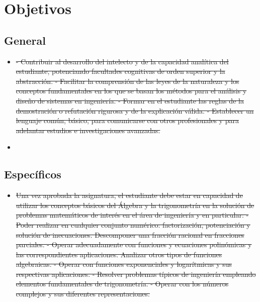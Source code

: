 \documentclass[11pt]{article}
\providecommand{\DIFaddtex}[1]{{\protect\color{blue}\uwave{#1}}} %
\providecommand{\DIFdeltex}[1]{{\protect\color{red}\sout{#1}}}                      %
\providecommand{\DIFaddbegin}{} %
\providecommand{\DIFaddend}{} %
\providecommand{\DIFdelbegin}{} %
\providecommand{\DIFdelend}{} %
\providecommand{\DIFadd}[1]{\texorpdfstring{\DIFaddtex{#1}}{#1}} %
\providecommand{\DIFdel}[1]{\texorpdfstring{\DIFdeltex{#1}}{}} %
\newcommand{\DIFscaledelfig}{0.5}
\newlength{\DIFdelgraphicswidth} %
\newlength{\DIFdelgraphicsheight} %
\newcommand{\DIFaddincludegraphics}[2][]{{\color{blue}\fbox{\DIFOincludegraphics[#1]{#2}}}} %
\newcommand{\DIFdelincludegraphics}[2][]{%
\sbox{\DIFdelgraphicsbox}{\DIFOincludegraphics[#1]{#2}}%
\settoboxwidth{\DIFdelgraphicswidth}{\DIFdelgraphicsbox} %
\settoboxtotalheight{\DIFdelgraphicsheight}{\DIFdelgraphicsbox} %
\scalebox{\DIFscaledelfig}{%
\parbox[b]{\DIFdelgraphicswidth}{\usebox{\DIFdelgraphicsbox}\\[-\baselineskip] \rule{\DIFdelgraphicswidth}{0em}}\llap{\resizebox{\DIFdelgraphicswidth}{\DIFdelgraphicsheight}{%
\setlength{\unitlength}{\DIFdelgraphicswidth}%
\begin{picture}(1,1)%
\thicklines\linethickness{2pt} %
{\color[rgb]{1,0,0}\put(0,0){\framebox(1,1){}}}%
{\color[rgb]{1,0,0}\put(0,0){\line( 1,1){1}}}%
{\color[rgb]{1,0,0}\put(0,1){\line(1,-1){1}}}%
\end{picture}%
}\hspace*{3pt}}} %
} %
\DeclareRobustCommand{\DIFaddbegin}{\DIFOaddbegin \let\includegraphics\DIFaddincludegraphics} %
\DeclareRobustCommand{\DIFaddend}{\DIFOaddend \let\includegraphics\DIFOincludegraphics} %
\DeclareRobustCommand{\DIFdelbegin}{\DIFOdelbegin \let\includegraphics\DIFdelincludegraphics} %
\DeclareRobustCommand{\DIFdelend}{\DIFOaddend \let\includegraphics\DIFOincludegraphics} %
\begin{document}
\section*{Objetivos}

\subsection*{General}

\begin{itemize}
\item \DIFdelbegin \DIFdel{- Contribuir al desarrollo del intelecto y de la capacidad analítica del estudiante, potenciando facultades cognitivas de orden superior y la abstracción. - Facilitar la comprensión de las leyes de la naturaleza y los conceptos fundamentales en los que se basan los métodos para el análisis y diseño de sistemas en ingeniería. - Formar en el estudiante las reglas de la demostración o refutación rigurosa y de la explicación válida. - Establecer un lenguaje común, básico, para comunicarse con otros profesionales y para adelantar estudios e investigaciones avanzadas. 
}\DIFdelend \DIFaddbegin \DIFadd{general 1 }\item \DIFadd{general 2 
}\DIFaddend \end{itemize}

\subsection*{Específicos}

\begin{itemize}
\item \DIFdelbegin \DIFdel{Una vez aprobada la asignatura, el estudiante debe estar en capacidad de utilizar los conceptos básicos del Álgebra y la trigonometría en la solución de problemas matemáticos de interés en el área de ingeniería y en particular: - Poder realizar en cualquier conjunto numérico: factorización, potenciación y solución de inecuaciones. Descomponer una fracción racional en fracciones parciales. - Operar adecuadamente con funciones y ecuaciones polinómicas y las correspondientes aplicaciones. Analizar otros tipos de funciones algebraicas. - Operar con funciones exponenciales y logarítmicas y sus respectivas aplicaciones. - Resolver problemas típicos de ingeniería empleando elementos fundamentales de trigonometría. - Operar con los números complejos y sus diferentes representaciones. 
}\DIFdelend \DIFaddbegin \DIFadd{especifico 1 
}\DIFaddend \end{itemize}
\end{document}
